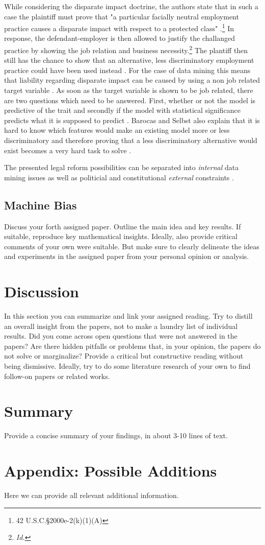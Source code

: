 \documentclass{article}
\begin{document}
While considering the disparate impact doctrine, the authors state that in such a case the plaintiff must prove that "a particular facially neutral employment practice causes a disparate impact with respect to a protected class" \cite{Barocas.2016} \cite{titleVII}.\footnote{ 42 U.S.C.§2000e-2(k)(1)(A) } In response, the defendant-employer is then allowed to justify the challanged practice by showing the job relation and business necessity.\footnote{ \textit{Id.} } The plantiff then still has the chance to show that an alternative, less discriminatory employment practice could have been used instead \cite{Barocas.2016}. For the case of data mining this means that liability regarding disparate impact can be caused by using a non job related target variable \cite{Barocas.2016}. As soon as the target variable is shown to be job related, there are two questions which need to be answered. First, whether or not the model is predictive of the trait and secondly if the model with statistical significance predicts what it is supposed to predict \cite{Barocas.2016}. Barocas and Selbst also explain that it is hard to know which features would make an existing model more or less discriminatory and therefore proving that a less discriminatory alternative would exist becomes a very hard task to solve \cite{Barocas.2016}.

The presented legal reform possibilities can be separated into \textit{internal} data mining issues as well as politicial and constitutional \textit{external} constraints \cite{Barocas.2016}. 
\subsection{Machine Bias}

Discuss your forth assigned paper. Outline the main idea and key results. If suitable, reproduce key mathematical insights. Ideally, also provide critical comments of your own were suitable. But make sure to clearly delineate the ideas and experiments in the assigned paper from your personal opinion or analysis.

\section{Discussion}

In this section you can summarize and link your assigned reading. Try to distill an overall insight from the papers, not to make a laundry list of individual results. Did you come across open questions that were not answered in the papers? Are there hidden pitfalls or problems that, in your opinion, the papers do not solve or marginalize? Provide a critical but constructive reading without being dismissive. Ideally, try to do some literature research of your own to find follow-on papers or related works. 

\section{Summary}

Provide a concise summary of your findings, in about 3-10 lines of text.

\section{Appendix: Possible Additions}
Here we can provide all relevant additional information.

\medskip
\small


\end{document}
